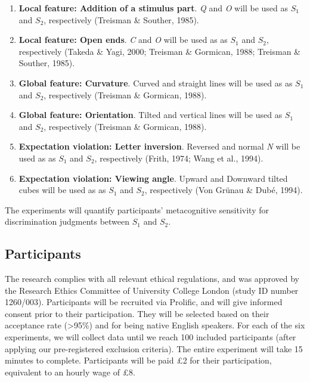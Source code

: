 \documentclass[
  english,
  man,floatsintext]{apa6}
\providecommand{\tightlist}{%
  \setlength{\itemsep}{0pt}\setlength{\parskip}{0pt}}
\begin{document}
\begin{enumerate}
\def\labelenumi{\arabic{enumi}.}
\tightlist
\item
  \textbf{Local feature: Addition of a stimulus part}. \emph{Q} and \emph{O} will be used as \(S_1\) and \(S_2\), respectively (Treisman \& Souther, 1985).
\item
  \textbf{Local feature: Open ends}. \emph{C} and \emph{O} will be used as as \(S_1\) and \(S_2\), respectively (Takeda \& Yagi, 2000; Treisman \& Gormican, 1988; Treisman \& Souther, 1985).
\item
  \textbf{Global feature: Curvature}. Curved and straight lines will be used as as \(S_1\) and \(S_2\), respectively (Treisman \& Gormican, 1988).
\item
  \textbf{Global feature: Orientation}. Tilted and vertical lines will be used as \(S_1\) and \(S_2\), respectively (Treisman \& Gormican, 1988).
\item
  \textbf{Expectation violation: Letter inversion}. Reversed and normal \emph{N} will be used as as \(S_1\) and \(S_2\), respectively (Frith, 1974; Wang et al., 1994).
\item
  \textbf{Expectation violation: Viewing angle}. Upward and Downward tilted cubes will be used as as \(S_1\) and \(S_2\), respectively (Von Grünau \& Dubé, 1994).
\end{enumerate}

The experiments will quantify participants' metacognitive sensitivity for discrimination judgments between \(S_1\) and \(S_2\).

\hypertarget{participants}{%
\subsection{Participants}\label{participants}}

The research complies with all relevant ethical regulations, and was approved by the Research Ethics Committee of University College London (study ID number 1260/003). Participants will be recruited via Prolific, and will give informed consent prior to their participation. They will be selected based on their acceptance rate (\textgreater95\%) and for being native English speakers. For each of the six experiments, we will collect data until we reach 100 included participants (after applying our pre-registered exclusion criteria). The entire experiment will take 15 minutes to complete. Participants will be paid £2 for their participation, equivalent to an hourly wage of £8.
\end{document}
